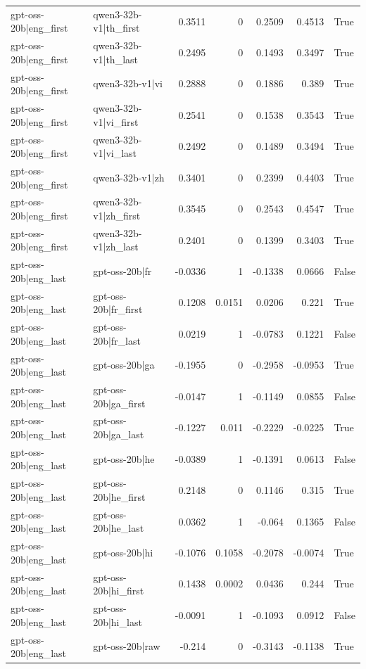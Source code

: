 \begin{table}
\begin{tabular}{l l r r r r l}
gpt-oss-20b|eng_first & qwen3-32b-v1|th_first & 0.3511 & 0 & 0.2509 & 0.4513 & True \\
gpt-oss-20b|eng_first & qwen3-32b-v1|th_last & 0.2495 & 0 & 0.1493 & 0.3497 & True \\
gpt-oss-20b|eng_first & qwen3-32b-v1|vi & 0.2888 & 0 & 0.1886 & 0.389 & True \\
gpt-oss-20b|eng_first & qwen3-32b-v1|vi_first & 0.2541 & 0 & 0.1538 & 0.3543 & True \\
gpt-oss-20b|eng_first & qwen3-32b-v1|vi_last & 0.2492 & 0 & 0.1489 & 0.3494 & True \\
gpt-oss-20b|eng_first & qwen3-32b-v1|zh & 0.3401 & 0 & 0.2399 & 0.4403 & True \\
gpt-oss-20b|eng_first & qwen3-32b-v1|zh_first & 0.3545 & 0 & 0.2543 & 0.4547 & True \\
gpt-oss-20b|eng_first & qwen3-32b-v1|zh_last & 0.2401 & 0 & 0.1399 & 0.3403 & True \\
gpt-oss-20b|eng_last & gpt-oss-20b|fr & -0.0336 & 1 & -0.1338 & 0.0666 & False \\
gpt-oss-20b|eng_last & gpt-oss-20b|fr_first & 0.1208 & 0.0151 & 0.0206 & 0.221 & True \\
gpt-oss-20b|eng_last & gpt-oss-20b|fr_last & 0.0219 & 1 & -0.0783 & 0.1221 & False \\
gpt-oss-20b|eng_last & gpt-oss-20b|ga & -0.1955 & 0 & -0.2958 & -0.0953 & True \\
gpt-oss-20b|eng_last & gpt-oss-20b|ga_first & -0.0147 & 1 & -0.1149 & 0.0855 & False \\
gpt-oss-20b|eng_last & gpt-oss-20b|ga_last & -0.1227 & 0.011 & -0.2229 & -0.0225 & True \\
gpt-oss-20b|eng_last & gpt-oss-20b|he & -0.0389 & 1 & -0.1391 & 0.0613 & False \\
gpt-oss-20b|eng_last & gpt-oss-20b|he_first & 0.2148 & 0 & 0.1146 & 0.315 & True \\
gpt-oss-20b|eng_last & gpt-oss-20b|he_last & 0.0362 & 1 & -0.064 & 0.1365 & False \\
gpt-oss-20b|eng_last & gpt-oss-20b|hi & -0.1076 & 0.1058 & -0.2078 & -0.0074 & True \\
gpt-oss-20b|eng_last & gpt-oss-20b|hi_first & 0.1438 & 0.0002 & 0.0436 & 0.244 & True \\
gpt-oss-20b|eng_last & gpt-oss-20b|hi_last & -0.0091 & 1 & -0.1093 & 0.0912 & False \\
gpt-oss-20b|eng_last & gpt-oss-20b|raw & -0.214 & 0 & -0.3143 & -0.1138 & True \\

\end{tabular}
\end{table}
